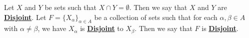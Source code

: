 \newcommand{\Disjoint}[0]{\textbf{\hyperref[def:Disjoint]{Disjoint}}\xspace}
\newcommand{\Disjointedness}[0]{\textbf{\hyperref[def:Disjoint]{Disjointedness}}\xspace}
\begin{df}[Disjoint]
\label{def:Disjoint}

\rm
    Let $X$ and $Y$ be sets such that 
    $X \cap Y = \emptyset$. 
    Then we say that $X$ and $Y$ are 
    \Disjoint. 
    Let $F=\{X_{\alpha}\}_{\alpha \in A}$ 
	be a collection of sets
    such that for each $\alpha, \beta \in A$ 
    with $\alpha \neq \beta$, we have 
    $X_\alpha$ 
    is \Disjoint
    to 
    $X_{\beta}$. 
    Then we say that $F$ is \Disjoint. 
\end{df}
